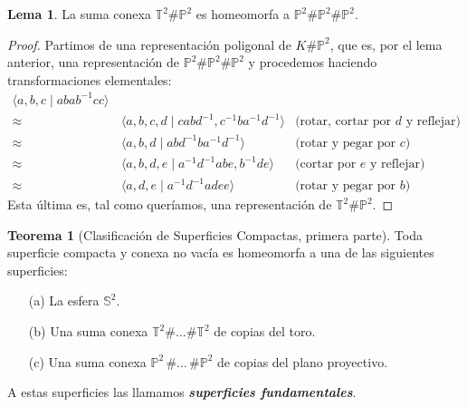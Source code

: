 \documentclass[10pt]{report}
\newcommand{\Esfera}{\mathbb{S}^2}
\newcommand{\Toro}{\mathbb{T}^2}
\newcommand{\Proyectivo}{\mathbb{P}^2}
\newcommand{\enfatiza}[1]{\textbf{\textit{#1}}}
\theoremstyle{definition}
\newtheorem{tma}[defin]{Teorema}
\newtheorem{lema}[defin]{Lema}
\begin{document}
\begin{lema}\label{lema:toro_proyectivo}
La suma conexa $\Toro \# \Proyectivo$ es homeomorfa a $\Proyectivo \# \Proyectivo \# \Proyectivo$.
\end{lema}
\begin{proof}
Partimos de una representación poligonal de $K\# \Proyectivo$, que es, por el lema anterior, una representación de $\Proyectivo \# \Proyectivo \# \Proyectivo$ y procedemos haciendo transformaciones elementales:
\begin{align*}
\langle a,b,c \mid abab^{-1}cc \rangle &&\\
\approx &\, \langle a,b,c,d \mid cabd^{-1}, c^{-1}ba^{-1}d^{-1} \rangle &\text{(rotar, cortar por } d\text{ y reflejar)}\\
\approx &\, \langle a,b,d \mid abd^{-1}ba^{-1}d^{-1}\rangle & \text{(rotar y pegar por } c\text{)}\\
\approx &\, \langle a,b,d,e \mid a^{-1}d^{-1}abe, b^{-1}de\rangle & \text{(cortar por }e\text{ y reflejar)}\\
\approx &\, \langle a,d,e\mid a^{-1}d^{-1}adee\rangle & \text{(rotar y pegar por } b \text{)} 
\end{align*}
Esta última es, tal como queríamos, una representación de $\Toro \# \Proyectivo$.
\end{proof}

\begin{tma}[Clasificación de Superficies Compactas, primera parte]\label{teo:csc}
Toda superficie compacta y conexa no vacía es homeomorfa a una de las siguientes superficies:
\begin{itemize}
\item[(a)] La esfera $\Esfera$.
\item[(b)] Una suma conexa $\Toro \# \dots \# \Toro$ de copias del toro.
\item[(c)] Una suma conexa $\Proyectivo \,  \# \dots\, \# \Proyectivo$ de copias del plano proyectivo. 
\end{itemize}
A estas superficies las llamamos \enfatiza{superficies fundamentales}.
\end{tma}
\end{document}
